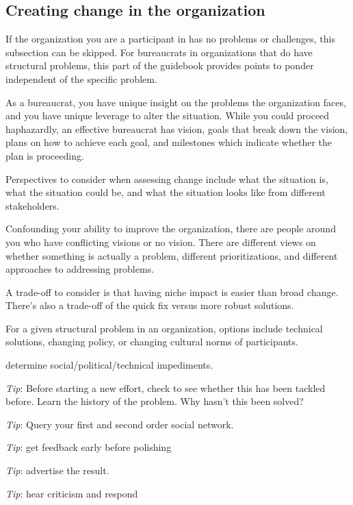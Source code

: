 \subsection{Creating change in the organization\label{sec:creating_change}}

If the organization you are a participant in has no problems or challenges, this subsection can be skipped. For bureaucrats in organizations that do have structural problems, this part of the guidebook provides points to ponder independent of the specific problem.

As a bureaucrat, you have unique insight on the problems the organization faces, and you have unique leverage to alter the situation.  While you could proceed haphazardly, an effective bureaucrat has vision, goals that break down the vision, plans on how to achieve each goal, and milestones which indicate whether the plan is proceeding. 

Perspectives to consider when assessing change include what the situation is, what the situation could be, and what the situation looks like from different stakeholders.

Confounding your ability to improve the organization, there are people around you who have conflicting visions or no vision. There are different views on whether something is actually a problem, different prioritizations, and different approaches to addressing problems.

A trade-off to consider is that having niche impact is easier than broad change. There's also a trade-off of the quick fix versus more robust solutions.

For a given structural problem in an organization, options include technical solutions, changing policy, or changing cultural norms of participants.

determine social/political/technical impediments. 

\textit{Tip}: Before starting a new effort, check to see whether this has been tackled before.
Learn the history of the problem. Why hasn't this been solved?

\textit{Tip}: Query your first and second order social network.

\textit{Tip}: get feedback early  before polishing

\textit{Tip}: advertise the result.

\textit{Tip}: hear criticism and respond

